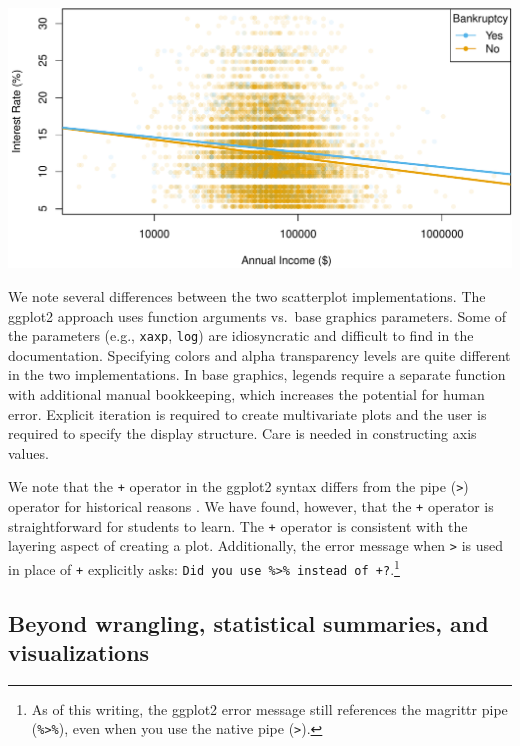 \documentclass[12pt]{article}
\begin{document}
\begin{center}\includegraphics[width=0.8\linewidth]{educators-perspective-tidyverse_files/figure-latex/base-scat-1} \end{center}

\label{base-scat} \linespread{2}
\vspace{3mm}\setlength{\parindent}{15pt}

We note several differences between the two scatterplot implementations.
The ggplot2 approach uses function arguments vs.~base graphics
parameters. Some of the parameters (e.g., \texttt{xaxp}, \texttt{log})
are idiosyncratic and difficult to find in the documentation. Specifying
colors and alpha transparency levels are quite different in the two
implementations. In base graphics, legends require a separate function
with additional manual bookkeeping, which increases the potential for
human error. Explicit iteration is required to create multivariate plots
and the user is required to specify the display structure. Care is
needed in constructing axis values.

We note that the \texttt{+} operator in the ggplot2 syntax differs from
the pipe (\texttt{\textbar{}\textgreater{}}) operator for historical
reasons \citep{wickham2015pipe}. We have found, however, that the
\texttt{+} operator is straightforward for students to learn. The
\texttt{+} operator is consistent with the layering aspect of creating a
plot. Additionally, the error message when
\texttt{\textbar{}\textgreater{}} is used in place of \texttt{+}
explicitly asks:
\texttt{Did\ you\ use\ \%\textgreater{}\%\ instead\ of\ +?}.\footnote{As
  of this writing, the ggplot2 error message still references the
  magrittr pipe (\texttt{\%\textgreater{}\%}), even when you use the
  native pipe (\texttt{\textbar{}\textgreater{}}).}

\hypertarget{sec:extra}{%
\subsection{Beyond wrangling, statistical summaries, and
visualizations}\label{sec:extra}}
\end{document}
